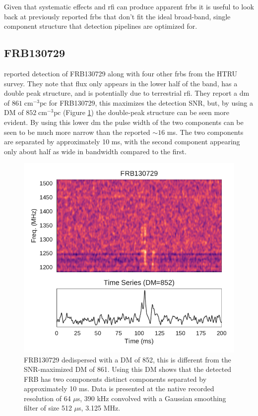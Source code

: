 \documentclass[a4paper,fleqn,usenatbib]{mnras}
\begin{document}
Given that systematic effects and \gls{rfi} can produce apparent \glspl{frb} it
is useful to look back at previously reported \glspl{frb} that don't fit the
ideal broad-band, single component structure that detection pipelines are
optimized for.

\subsection{FRB130729}

\cite{2016MNRAS.460L..30C} reported detection of FRB130729 along with four other
\glspl{frb} from the HTRU survey. They note that flux only appears in the lower
half of the band, has a double peak structure, and is potentially due to
terrestrial \gls{rfi}.  They report a \gls{dm} of $861 \; \textrm{cm}^{-3}
\textrm{pc}$ for FRB130729, this maximizes the detection SNR, but, by using a DM
of $852 \; \textrm{cm}^{-3} \textrm{pc}$ (Figure \ref{fig:FRB130729}) the
double-peak structure can be seen more evident. By using this lower \gls{dm} the
pulse width of the two components can be seen to be much more narrow than the
reported $\sim 16$ ms.  The two components are separated by approximately 10 ms,
with the second component appearing only about half as wide in bandwidth
compared to the first. 

\begin{figure}
    \includegraphics[width=1.0\linewidth]{figures/FRB130729.pdf}
    \caption{FRB130729 dedispersed with a DM of 852, this is different from the
    SNR-maximized DM of 861. Using this DM shows that the detected FRB has two
    components distinct components separated by approximately 10 ms. Data is
    presented at the native recorded resolution of 64 $\mu$s, 390 kHz convolved
    with a Gaussian smoothing filter of size 512 $\mu$s, 3.125 MHz.
    }
    \label{fig:FRB130729}
\end{figure}
\end{document}
